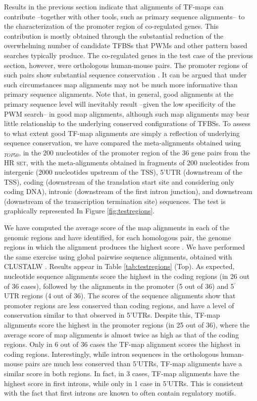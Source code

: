 Results in the previous section indicate that alignments of TF-maps
can contribute --together with other tools, such as primary sequence
alignments-- to the characterization of the promoter region of
co-regulated genes. This contribution is mostly 
obtained through the substantial reduction of the overwhelming number 
of candidate TFBSs that PWMs and other pattern based searches 
typically produce. The co-regulated genes in the test 
case of the previous section, however, were orthologous human-mouse
pairs. The promoter regions of such pairs show substantial sequence 
conservation \citep{waterston:2002a}. It can be argued that under such 
circumstances map alignments may not be much more informative than 
primary sequence alignments. Note that, in general, good alignments 
at the primary sequence level will inevitably result 
--given the low specificity of the PWM search-- in good 
map alignments, although such map alignments may bear 
little relationship to the underlying conserved 
configurations of TFBSs. To assess to what extent good 
TF-map alignments are simply a reflection of underlying 
sequence conservation, we have compared the meta-alignments obtained using 
$_{TOP50}$, in the 200 nucleotides of the promoter region of the 36 
gene pairs from the \textsc{HR set}, with the meta-alignments obtained in fragments 
of 200 nucleotides from intergenic (2000 nucleotides upstream of the TSS), 
5'UTR (downstream of the TSS), coding (downstream of the translation start 
site and considering only coding DNA), intronic (downstream of the first intron 
junction), and downstream (downstream of the transcription termination 
site) sequences. The test is graphically represented In Figure 
\ref{fig:testregions}.

We have computed the average score of the map alignments in each of the genomic 
regions and have identified, for each homologous pair, the genome regions in which 
the alignment produces the highest score \citep{blanco:2006b}. We have performed 
the same exercise using global pairwise sequence alignments, obtained with CLUSTALW 
\citep{thompson:1994a}. 
Results appear in Table \ref{tab:testregions} (Top). As expected, nucleotide sequence
alignments score the highest in the coding regions (in 26 out of 36
cases), followed by the alignments in the promoter (5 out of 36) and
5$^\prime$ UTR regions (4 out of 36). The scores of the sequence 
alignments show that promoter regions are less conserved than coding regions,
and have a level of conservation similar to that observed in 5'UTRs. 
Despite this, TF-map alignments score the highest in the promoter
regions (in 25 out of 36), where the average score of map alignments 
is almost twice as high as that of the coding regions. Only in 6 out
of 36 cases the TF-map alignment scores the highest in coding regions. 
Interestingly, while intron sequences in the orthologous human-mouse
pairs are much less conserved than 5'UTRs, TF-map alignments 
have a similar score in both regions. In fact, in 3 cases, TF-map
alignments have the highest score in first introns, while only in 1 case in
5'UTRs. This is consistent with the fact that first introns are known
to often contain regulatory motifs. 

